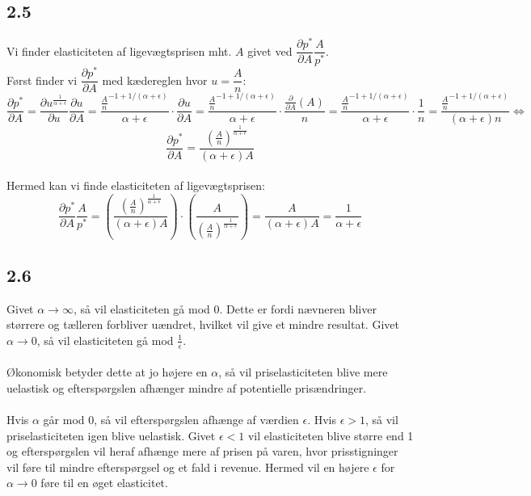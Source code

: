 \documentclass[a4paper, 12pt]{article}
\begin{document}
\subsection*{2.5}
Vi finder elasticiteten af ligevægtsprisen mht. $A$ givet ved $\dfrac{\partial p^{*}}{\partial A}\dfrac{A}{p^{*}}$.
\\
Først finder vi $\dfrac{\partial p^{*}}{\partial A}$ med kædereglen hvor $u=\dfrac{A}{n}$:
$$\dfrac{\partial p^{*}}{\partial A} = \dfrac{\partial u^{\frac{1}{\alpha + \epsilon}}}{\partial u} \dfrac{\partial u}{\partial A} = \dfrac{\frac{A}{n}^{-1+1/  (\alpha + \epsilon)}}{\alpha + \epsilon} \cdot  \dfrac{\partial u}{\partial A} = \dfrac{\frac{A}{n}^{-1+1/  (\alpha + \epsilon)}}{\alpha + \epsilon} \cdot  \dfrac{\frac{\partial}{\partial A} (A)}{n} = \dfrac{\frac{A}{n}^{-1+1/  (\alpha + \epsilon)}}{\alpha + \epsilon} \cdot  \dfrac{1}{n} = \dfrac{\frac{A}{n}^{-1+1/  (\alpha + \epsilon)}}{(\alpha + \epsilon)n} \Leftrightarrow $$ 
$$\dfrac{\partial p^{*}}{\partial A} = \dfrac{\left( \frac{A}{n} \right)^{\frac{1}{\alpha + \epsilon}}}{(\alpha + \epsilon)A} $$
\\
Hermed kan vi finde elasticiteten af ligevægtsprisen:
$$\dfrac{\partial p^{*}}{\partial A}\dfrac{A}{p^{*}} =\left( \dfrac{\left( \frac{A}{n} \right)^{\frac{1}{\alpha + \epsilon}}}{(\alpha + \epsilon)A} \right) \cdot \left( \dfrac{A}{ \left( \frac{A}{n} \right)^{\frac{1}{\alpha + \epsilon}}} \right) = \dfrac{A}{(\alpha + \epsilon )A} = \dfrac{1}{\alpha + \epsilon}$$

\subsection*{2.6}
Givet $\alpha \rightarrow \infty$, så vil elasticiteten gå mod $0$. Dette er fordi nævneren bliver størrere og tælleren forbliver uændret, hvilket vil give et mindre resultat. Givet $\alpha \rightarrow 0$, så vil elasticiteten gå mod $\frac{1}{\epsilon}$.
\\\\
Økonomisk betyder dette at jo højere en $\alpha$, så vil priselasticiteten blive mere uelastisk og efterspørgslen afhænger mindre af potentielle prisændringer.
\\\\
Hvis $\alpha$ går mod $0$, så vil efterspørgslen afhænge af værdien $\epsilon$. Hvis $\epsilon > 1$, så vil priselasticiteten igen blive uelastisk. Givet $\epsilon < 1$ vil elasticiteten blive større end 1 og efterspørgslen vil heraf afhænge mere af prisen på varen, hvor prisstigninger vil føre til mindre efterspørgsel og et fald i revenue. Hermed vil en højere $\epsilon$ for $\alpha \rightarrow 0$ føre til en øget elasticitet.
\end{document}
